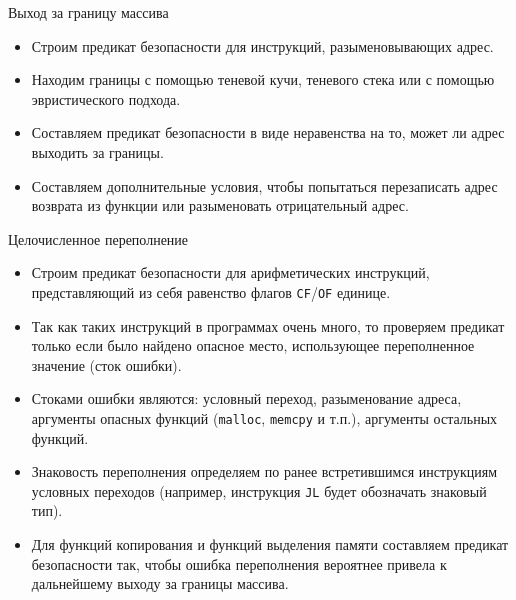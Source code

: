 \documentclass[10pt]{beamer}
\begin{document}
\begin{frame}{Выход за границу массива}
\begin{itemize}
    \item Строим предикат безопасности для инструкций, разыменовывающих адрес.
    \item Находим границы с помощью теневой кучи, теневого стека или с помощью
        эвристического подхода.
    \item Составляем предикат безопасности в виде неравенства на то, может ли
        адрес выходить за границы.
    \item Составляем дополнительные условия, чтобы попытаться перезаписать адрес
        возврата из функции или разыменовать отрицательный адрес.
\end{itemize}
\end{frame}

\begin{frame}{Целочисленное переполнение}
\begin{itemize}
    \item Строим предикат безопасности для арифметических инструкций,
        представляющий из себя равенство флагов \texttt{CF}/\texttt{OF} единице.
    \item Так как таких инструкций в программах очень много, то проверяем предикат
        только если было найдено опасное место, использующее
        переполненное значение (сток ошибки).
    \item Стоками ошибки являются: условный переход, разыменование
        адреса, аргументы опасных функций (\texttt{malloc}, \texttt{memcpy} и
        т.п.),
        аргументы остальных функций.
    \item Знаковость переполнения определяем по ранее встретившимся инструкциям
        условных переходов (например, инструкция \texttt{JL} будет обозначать
        знаковый тип).
    \item Для функций копирования и функций выделения памяти составляем предикат
        безопасности так, чтобы ошибка переполнения вероятнее привела к
        дальнейшему выходу за границы массива.
\end{itemize}
\end{frame}
\end{document}
